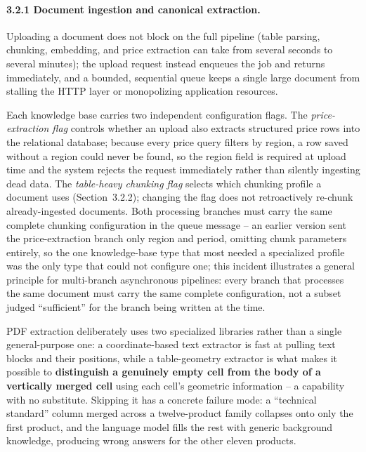 \documentclass[11pt,a4paper]{article}
\begin{document}
\paragraph{3.2.1 Document ingestion and canonical extraction.}
Uploading a document does not block on the full pipeline (table parsing,
chunking, embedding, and price extraction can take from several seconds to
several minutes); the upload request instead enqueues the job and returns
immediately, and a bounded, sequential queue keeps a single large document
from stalling the HTTP layer or monopolizing application resources.

Each knowledge base carries two independent configuration flags. The
\emph{price-extraction flag} controls whether an upload also extracts
structured price rows into the relational database; because every price
query filters by region, a row saved without a region could never be found,
so the region field is required at upload time and the system rejects the
request immediately rather than silently ingesting dead data. The
\emph{table-heavy chunking flag} selects which chunking profile a document
uses (Section~3.2.2); changing the flag does not retroactively re-chunk
already-ingested documents. Both processing branches must carry the same
complete chunking configuration in the queue message -- an earlier version
sent the price-extraction branch only region and period, omitting chunk
parameters entirely, so the one knowledge-base type that most needed a
specialized profile was the only type that could not configure one; this
incident illustrates a general principle for multi-branch asynchronous
pipelines: every branch that processes the same document must carry the same
complete configuration, not a subset judged ``sufficient'' for the branch
being written at the time.

PDF extraction deliberately uses two specialized libraries rather than a
single general-purpose one: a coordinate-based text extractor is fast at
pulling text blocks and their positions, while a table-geometry extractor is
what makes it possible to \textbf{distinguish a genuinely empty cell from
the body of a vertically merged cell} using each cell's geometric
information -- a capability with no substitute. Skipping it has a concrete
failure mode: a ``technical standard'' column merged across a twelve-product
family collapses onto only the first product, and the language model fills
the rest with generic background knowledge, producing wrong answers for the
other eleven products.
\end{document}
